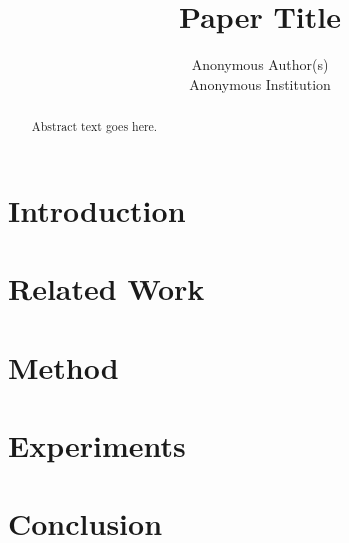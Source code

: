 \documentclass[letterpaper,twocolumn,10pt]{article}
\title{Paper Title}
\author{
{\rm Anonymous Author(s)}\\
Anonymous Institution
}
\begin{document}
\maketitle

\begin{abstract}
Abstract text goes here.
\end{abstract}

\section{Introduction}

\section{Related Work}

\section{Method}

\section{Experiments}

\section{Conclusion}



\end{document}

